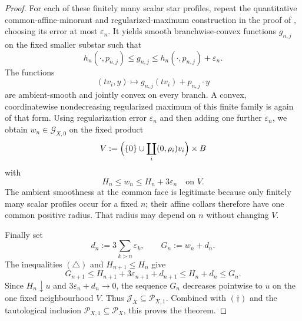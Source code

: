 \begin{proof}
For each of these finitely many scalar star profiles, repeat the quantitative
common-affine-minorant and regularized-maximum construction in the proof of
, choosing its error at most
\(\varepsilon_n\).  It yields smooth branchwise-convex functions
\(g_{n,j}\) on the fixed smaller substar such that
\[
 h_n(\cdot,p_{n,j})\leq g_{n,j}
 \leq h_n(\cdot,p_{n,j})+\varepsilon_n.
\]
The functions
\[
               (tv_i,y)\longmapsto g_{n,j}(tv_i)+p_{n,j}\mathbin\cdot y
\]
are ambient-smooth and jointly convex on every branch.  A convex,
coordinatewise nondecreasing regularized maximum of this finite family is
again of that form.  Using regularization error \(\varepsilon_n\) and then
adding one further \(\varepsilon_n\), we obtain
\(w_n\in\mathcal G_{X,0}\) on the fixed product
\[
 V:=\Bigl(\{0\}\cup\coprod_i(0,\rho_i)v_i\Bigr)\times B
\]
with
\[
                         H_n\leq w_n\leq H_n+3\varepsilon_n
 \quad\text{on }V.
 \tag{\(\triangle\)}
\]
The ambient smoothness at the common face is legitimate because only
finitely many scalar profiles occur for a fixed \(n\); their affine collars
therefore have one common positive radius.  That radius may depend on \(n\)
without changing \(V\).

Finally set
\[
 d_n:=3\sum_{k>n}\varepsilon_k,
 \qquad
 G_n:=w_n+d_n.
\]
The inequalities \((\triangle)\) and \(H_{n+1}\leq H_n\) give
\[
 G_{n+1}\leq H_{n+1}+3\varepsilon_{n+1}+d_{n+1}
 \leq H_n+d_n\leq G_n.
\]
Since \(H_n\downarrow u\) and \(3\varepsilon_n+d_n\to0\), the sequence
\(G_n\) decreases pointwise to \(u\) on the one fixed neighbourhood \(V\).
Thus \(\mathcal J_X\subseteq\mathcal P_{X,1}\).  Combined with
\((\dagger)\) and the tautological inclusion
\(\mathcal P_{X,1}\subseteq\mathcal P_X\), this proves the theorem.
\end{proof}
